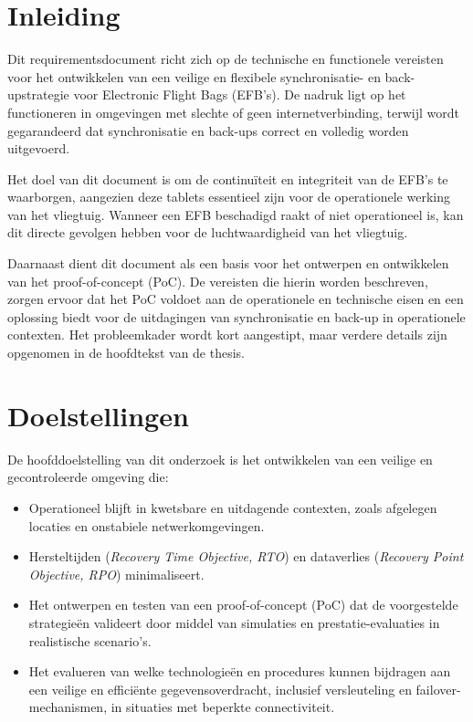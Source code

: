     \section{Inleiding}
    Dit requirementsdocument richt zich op de technische en functionele vereisten voor het ontwikkelen van een veilige en flexibele synchronisatie- en back-upstrategie voor Electronic Flight Bags (EFB's). De nadruk ligt op het functioneren in omgevingen met slechte of geen internetverbinding, terwijl wordt gegarandeerd dat synchronisatie en back-ups correct en volledig worden uitgevoerd.
    
    Het doel van dit document is om de continuïteit en integriteit van de EFB's te waarborgen, aangezien deze tablets essentieel zijn voor de operationele werking van het vliegtuig. Wanneer een EFB beschadigd raakt of niet operationeel is, kan dit directe gevolgen hebben voor de luchtwaardigheid van het vliegtuig.
    
    Daarnaast dient dit document als een basis voor het ontwerpen en ontwikkelen van het proof-of-concept (PoC). De vereisten die hierin worden beschreven, zorgen ervoor dat het PoC voldoet aan de operationele en technische eisen en een oplossing biedt voor de uitdagingen van synchronisatie en back-up in operationele contexten. Het probleemkader wordt kort aangestipt, maar verdere details zijn opgenomen in de hoofdtekst van de thesis.
    
    \section{Doelstellingen}
    De hoofddoelstelling van dit onderzoek is het ontwikkelen van een veilige en gecontroleerde omgeving die:
    \begin{itemize}
        \item Operationeel blijft in kwetsbare en uitdagende contexten, zoals afgelegen locaties en onstabiele netwerkomgevingen.
        \item Hersteltijden (\textit{Recovery Time Objective, RTO}) en dataverlies (\textit{Recovery Point Objective, RPO}) minimaliseert.
        \item Het ontwerpen en testen van een proof-of-concept (PoC) dat de voorgestelde strategieën valideert door middel van simulaties en prestatie-evaluaties in realistische scenario’s.
        \item Het evalueren van welke technologieën en procedures kunnen bijdragen aan een veilige en efficiënte gegevensoverdracht, inclusief versleuteling en failover-mechanismen, in situaties met beperkte connectiviteit.
    \end{itemize}
    
